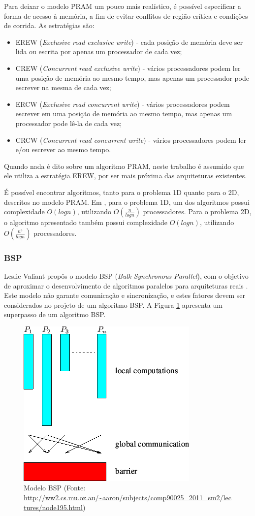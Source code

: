 \documentclass[a4paper, 12pt] {article}
\begin{document}
Para deixar o modelo PRAM um pouco mais realístico, é possível especificar a
forma de acesso à memória, a fim de evitar conflitos de região crítica e condições de
corrida. As estratégias são:

\begin{itemize}
  \item EREW (\textit{Exclusive read exclusive write}) - cada posição de memória
  deve ser lida ou escrita por apenas um processador de cada vez;
  \item CREW (\textit{Concurrent read exclusive write}) -  vários processadores
  podem ler uma posição de memória ao mesmo tempo, mas apenas um processador
  pode escrever na mesma de cada vez;
  \item ERCW (\textit{Exclusive read concurrent write}) - vários processadores
  podem escrever em uma posição de memória ao mesmo tempo, mas apenas um
  processador pode lê-la de cada vez;
  \item CRCW (\textit{Concurrent read concurrent write}) - vários processadores
  podem ler e/ou escrever ao mesmo tempo.
\end{itemize}

Quando nada é dito sobre um algoritmo PRAM, neste trabalho é assumido que ele
utiliza a estratégia EREW, por ser mais próxima das arquiteturas existentes.

É possível encontrar algoritmos, tanto para o problema 1D quanto para o 2D,
descritos no modelo PRAM. Em \cite{journals/ppl/PerumallaD95}, para o problema
1D, um dos algoritmos  possui complexidade $O(log n)$, utilizando $O(\frac{n}{log
n})$ processadores. Para o problema 2D, o algoritmo apresentado também possui
complexidade $O(log n)$, utilizando $O(\frac{n^3}{log
n})$ processadores.

\subsubsection{BSP}

Leslie Valiant propôs o modelo BSP (\textit{Bulk Synchronous
Parallel}), com o objetivo de aproximar o
desenvolvimento de algoritmos paralelos para
arquiteturas reais \cite{Valiant:1990:BMP:79173.79181}. Este modelo não garante
comunicação e sincronização, e estes fatores devem ser considerados no projeto
de um algoritmo BSP. A Figura \ref{fig:bsp} apresenta um superpasso de um
algoritmo BSP.

\begin{figure}[ht]
\centering
\includegraphics[width=.4\textwidth]{bsp.png}
\caption{Modelo BSP (Fonte:
\url{http://ww2.cs.mu.oz.au/~aaron/subjects/comp90025_2011_sm2/lectures/node195.html}) }
\label{fig:bsp}
\end{figure}
\end{document}
